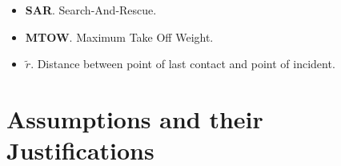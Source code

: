 \documentclass[12pt, letterpaper]{article}  %
\theoremstyle{definition}
\theoremstyle{remark}
\theoremstyle{plain}
\begin{document}
\begin{itemize}
\item \textbf{SAR}. Search-And-Rescue.

\item \textbf{MTOW}. Maximum Take Off Weight.

\item \textbf{$\tilde{r}$}. Distance between point of last contact and point of incident.


\end{itemize}


\section{Assumptions and their Justifications}\label{sec:assumptions}
\end{document}
